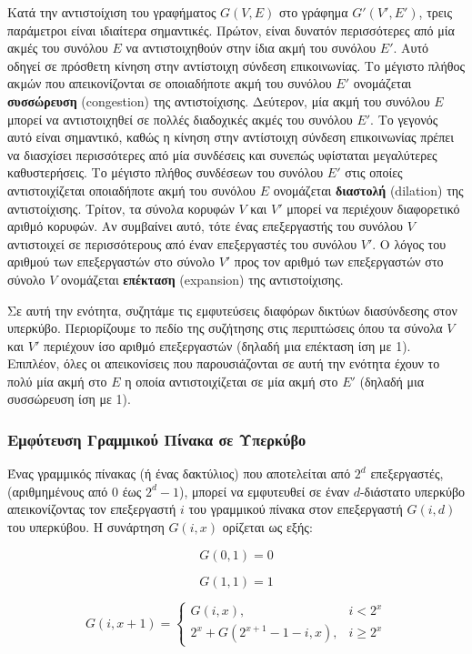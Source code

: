 \documentclass[12pt,a4paper]{article} %
\begin{document}
Κατά την αντιστοίχιση του γραφήματος $G(V,E)$ στο γράφημα $G'(V',E')$,
τρεις παράμετροι είναι ιδιαίτερα σημαντικές. Πρώτον, είναι δυνατόν 
περισσότερες από μία ακμές του συνόλου $E$ να αντιστοιχηθούν στην ίδια 
ακμή του συνόλου $E'$. Αυτό οδηγεί σε πρόσθετη κίνηση στην αντίστοιχη 
σύνδεση επικοινωνίας. Το μέγιστο πλήθος ακμών που απεικονίζονται σε 
οποιαδήποτε ακμή του συνόλου $E'$ ονομάζεται \textbf{συσσώρευση}
(congestion) της αντιστοίχισης. Δεύτερον, μία 
ακμή του συνόλου $E$ μπορεί να αντιστοιχηθεί σε πολλές διαδοχικές ακμές 
του συνόλου $E'$. Το γεγονός αυτό είναι σημαντικό, καθώς η κίνηση στην 
αντίστοιχη σύνδεση επικοινωνίας πρέπει να διασχίσει περισσότερες από μία 
συνδέσεις και συνεπώς υφίσταται μεγαλύτερες καθυστερήσεις. Το μέγιστο 
πλήθος συνδέσεων του συνόλου $E'$ στις οποίες αντιστοιχίζεται οποιαδήποτε 
ακμή του συνόλου $E$ ονομάζεται \textbf{διαστολή}
(dilation) της αντιστοίχισης. Τρίτον, τα 
σύνολα κορυφών $V$ και $V'$ μπορεί να περιέχουν διαφορετικό αριθμό κορυφών. 
Αν συμβαίνει αυτό, τότε ένας επεξεργαστής του συνόλου $V$ αντιστοιχεί σε 
περισσότερους από έναν επεξεργαστές του συνόλου $V'$. Ο λόγος του αριθμού 
των επεξεργαστών στο σύνολο $V'$ προς τον αριθμό των επεξεργαστών στο 
σύνολο $V$ ονομάζεται \textbf{επέκταση}
(expansion) της αντιστοίχισης.

Σε αυτή την ενότητα, συζητάμε τις εμφυτεύσεις διαφόρων δικτύων διασύνδεσης
στον υπερκύβο. Περιορίζουμε το πεδίο της συζήτησης στις περιπτώσεις όπου 
τα σύνολα $V$ και $V'$ περιέχουν ίσο αριθμό επεξεργαστών (δηλαδή μια 
επέκταση ίση με 1). Επιπλέον, όλες οι απεικονίσεις που παρουσιάζονται σε 
αυτή την ενότητα έχουν το πολύ μία ακμή στο $E$ η οποία αντιστοιχίζεται 
σε μία ακμή στο $E'$ (δηλαδή μια συσσώρευση ίση με 1).

\subsubsection{Εμφύτευση Γραμμικού Πίνακα σε Υπερκύβο}
Ένας γραμμικός πίνακας (ή ένας δακτύλιος) που αποτελείται από $2^d$ 
επεξεργαστές, (αριθμημένους από 0 έως $2^d - 1$), μπορεί να εμφυτευθεί 
σε έναν $d$-διάστατο υπερκύβο απεικονίζοντας τον επεξεργαστή $i$ του 
γραμμικού πίνακα στον επεξεργαστή $G(i,d)$ του υπερκύβου. Η συνάρτηση 
$G(i,x)$ ορίζεται ως εξής:

\[
G(0,1)=0
\]

\[
G(1,1)=1
\]

\[
G(i,x+1)=
\begin{cases}
G(i,x), & i < 2^x \\
2^x + G(2^{x+1}-1-i,x), & i \geq 2^x
\end{cases}
\]
\end{document}
